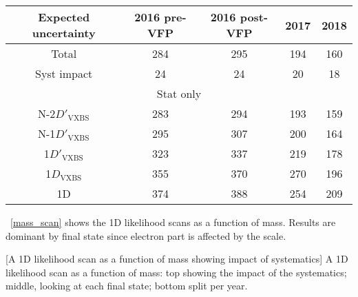\begin{table}[ht]	
\begin{center}
    \begin{tabular}{ccccc}
    \hline		
    Expected uncertainty	&	2016 pre-VFP	&	2016 post-VFP	&	2017	&	2018	\\
    \hline			
    Total	&	284	&	295	&	194	&	160	\\
    \hline			
    Syst impact	&	24	&	24	&	20	&	18	\\
    \hline
    \multicolumn{5}{c}{Stat only}\\
    \hline
    N-2$D'_\text{VXBS}$	&	283	&	294	&	193	&	159	\\
    N-1$D'_\text{VXBS}$	&	295	&	307	&	200	&	164	\\
    1$D'_\text{VXBS}$	&	323	&	337	&	219	&	178	\\
    1$D_\text{VXBS}$		&	355	&	370	&	270	&	196	\\
    1D				&	374	&	388	&	254	&	209	\\
    \hline			
    \end{tabular}
    \label{table:2D_refit_result_finals_year}
\end{center}
\end{table}
\figurename~\ref{mass_scan} shows the 1D likelihood scans as a function of mass.
Results are dominant by \fourmu final state since electron part is affected by the scale.
\begin{multiFigure}
    \centering
        [A 1D likelihood scan as a function of mass showing impact of systematics]
        {A 1D likelihood scan as a function of mass: top showing the impact of the systematics;
        middle, looking at each final state; bottom split per year.}
    \label{mass_scan}
\end{multiFigure}

